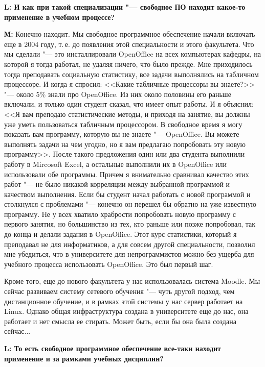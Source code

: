 \documentclass[10pt, a5paper]{article}
\begin{document}
{\noindent \bf L: И как при такой специализации "--- свободное ПО находит какое-то применение в учебном процессе?}

{\noindent \bf М:} Конечно находит. Мы свободное программное обеспечение начали включать еще в 2004 году, т.\,е. до появления этой специальности и этого факультета. Что мы сделали "--- это инсталлировали OpenOffice на всех компьютерах кафедры, на которой я тогда работал, не удаляя ничего, что было прежде. Мне приходилось тогда преподавать социальную статистику, все задачи выполнялись на табличном процессоре. И когда я спросил: <<Какие табличные процессоры вы знаете?>> "--- около 5\% знали про OpenOffice. Из них около половины его раньше включали, и только один студент сказал, что имеет опыт работы. И я объяснил: <<Я вам преподаю статистические методы, и приходя на занятие, вы должны уже уметь пользоваться табличным процессором. В свободное время я могу показать вам программу, которую вы не знаете "--- OpenOffice. Вы можете выполнять задачи на чем угодно, но я вам предлагаю попробовать эту новую программу>>. После такого предложения один или два студента выполнили работу в Mircosoft Excel, а остальные выполнили их в OpenOffice или использовали обе программы. Причем я внимательно сравнивал качество этих работ "--- не было никакой корреляции между выбранной программой и качеством выполнения. Если бы студент начал работать с новой программой и столкнулся с проблемами "--- конечно он перешел бы обратно на уже известную программу. Не у всех хватило храбрости попробовать новую программу с первого занятия, но большинство из тех, кто раньше или позже попробовал, так до конца и делали задания в OpenOffice. Этот курс статистики, который я преподавал не для информатиков, а для совсем другой специальности, позволил мне убедиться, что в университете для непрограммистов можно без ущерба для учебного процесса использовать OpenOffice. Это был первый шаг.

Кроме того, еще до нового факультета у нас использовалась система Moodle. Мы сейчас развиваем систему сетевого обучения "--- чуть другой подход, чем дистанционное обучение, и в рамках этой системы у нас сервер работает на Linux. Однако общая  инфраструктура создана в университете еще до нас, она работает и нет смысла ее стирать. Может быть, если бы она была создана сейчас...

{\noindent \bf L: То есть свободное программное обеспечение все-таки находит применение и за рамками учебных дисциплин?}
\end{document}
